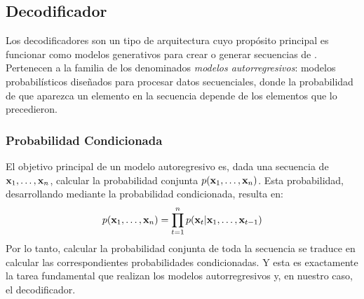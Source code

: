 \subsection{Decodificador}

Los decodificadores son un tipo de arquitectura cuyo propósito principal es 
funcionar como modelos generativos para crear o generar secuencias de \tokens{}. 
Pertenecen a la familia de los denominados \textit{modelos autorregresivos}: modelos 
probabilísticos diseñados para procesar datos secuenciales, donde la probabilidad de 
que aparezca un elemento en la secuencia depende de los elementos que lo precedieron.

\subsubsection{Probabilidad Condicionada}
El objetivo principal de un modelo autoregresivo es, dada una secuencia de \tokens{}
$\mathbf{x}_1, \dots, \mathbf{x}_n$, calcular la probabilidad conjunta $p(\mathbf{x}_1, \dots, \mathbf{x}_n)$. Esta probabilidad, desarrollando mediante la probabilidad condicionada, resulta en:
\begin{equation}
    p(\mathbf{x}_1, \dots, \mathbf{x}_n) = \prod_{t=1}^{n}p( \mathbf{x}_t | \mathbf{x}_1, \dots, \mathbf{x}_{t-1})
\end{equation}
Por lo tanto, calcular la probabilidad conjunta de toda la secuencia se traduce en calcular las correspondientes probabilidades condicionadas. Y esta es exactamente la tarea fundamental que realizan los modelos autorregresivos y, en nuestro caso, el decodificador.

